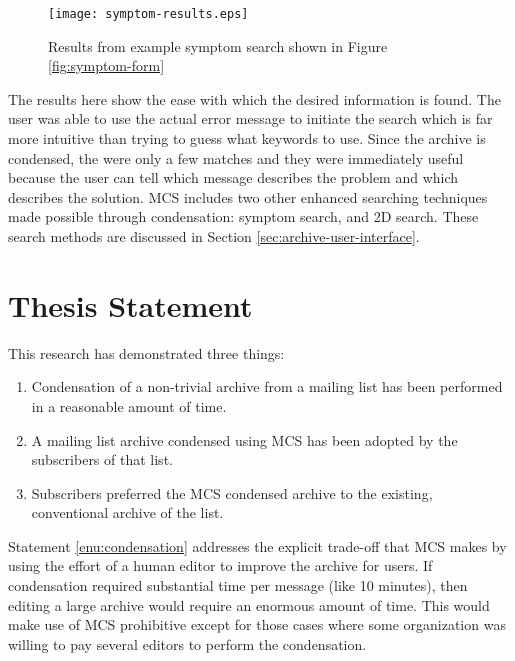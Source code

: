 \begin{figure}[htbp]
  \centering
  \texttt{[image: symptom-results.eps]}
  \caption{Results from example symptom search shown in Figure \ref{fig:symptom-form}}
  \label{fig:symptom-results}
\end{figure}

The results here show the ease with which the desired information is found. The
user was able to use the actual error message to initiate the search which is
far more intuitive than trying to guess what keywords to use. Since the archive
is condensed, the were only a few matches and they were immediately useful
because the user can tell which message describes the problem and which
describes the solution. MCS includes two other enhanced searching techniques
made possible through condensation: symptom search, and 2D search. These search
methods are discussed in Section \ref{sec:archive-user-interface}.

\pagebreak[4]

\section{Thesis Statement}
\label{sec:thesis-statement}
This research has demonstrated three things:

\begin{enumerate}
\item \label{enu:condensation}Condensation of a non-trivial archive from a
  mailing list has been performed in a reasonable amount of time.
\item \label{enu:adoption}A mailing list archive condensed using MCS has been
  adopted by the subscribers of that list.
\item \label{enu:preference}Subscribers preferred the MCS condensed archive to
  the existing, conventional archive of the list.
\end{enumerate}

Statement \ref{enu:condensation} addresses the explicit trade-off that MCS
makes by using the effort of a human editor to improve the archive for users.
If condensation required substantial time per message (like 10 minutes), then
editing a large archive would require an enormous amount of time. This would
make use of MCS prohibitive except for those cases where some organization was
willing to pay several editors to perform the condensation.

